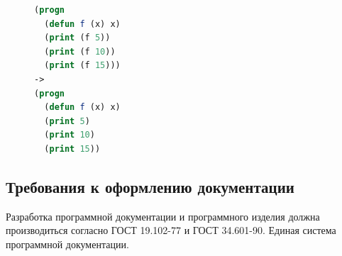 \begin{figure}[H]
\begin{lstlisting}[language=Lisp]
(progn
  (defun f (x) x)
  (print (f 5))
  (print (f 10))
  (print (f 15)))
->
(progn
  (defun f (x) x)
  (print 5)
  (print 10)
  (print 15))
\end{lstlisting}
\end{figure}



\subsection{Требования к оформлению документации}

Разработка программной документации и программного изделия должна производиться согласно ГОСТ 19.102-77 и ГОСТ 34.601-90. Единая система программной документации.
